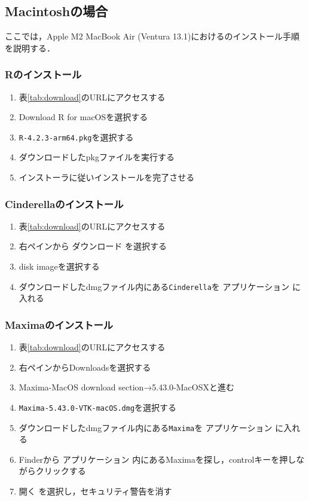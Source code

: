 \subsection{Macintoshの場合}

ここでは，Apple M2 MacBook Air (Ventura 13.1)における{\ketcindy}のインストール手順を説明する．

\subsubsection{Rのインストール}
\begin{enumerate}
    \item 表\ref{tab:download}のURLにアクセスする
    \item Download R for macOSを選択する
    \item \verb|R-4.2.3-arm64.pkg|を選択する
    \item ダウンロードしたpkgファイルを実行する
    \item インストーラに従いインストールを完了させる
\end{enumerate}

\subsubsection{Cinderellaのインストール}
\begin{enumerate}
    \item 表\ref{tab:download}のURLにアクセスする
    \item 右ペインから ダウンロード を選択する
    \item disk imageを選択する
    \item ダウンロードしたdmgファイル内にある\verb|Cinderella|を アプリケーション に入れる
\end{enumerate}

\subsubsection{Maximaのインストール}
\begin{enumerate}
    \item 表\ref{tab:download}のURLにアクセスする
    \item 右ペインからDownloadsを選択する
    \item Maxima-MacOS download section→5.43.0-MacOSXと進む
    \item \verb|Maxima-5.43.0-VTK-macOS.dmg|を選択する
    \item ダウンロードしたdmgファイル内にある\verb|Maxima|を アプリケーション に入れる
    \item Finderから アプリケーション 内にあるMaximaを探し，controlキーを押しながらクリックする
    \item 開く を選択し，セキュリティ警告を消す
\end{enumerate}

